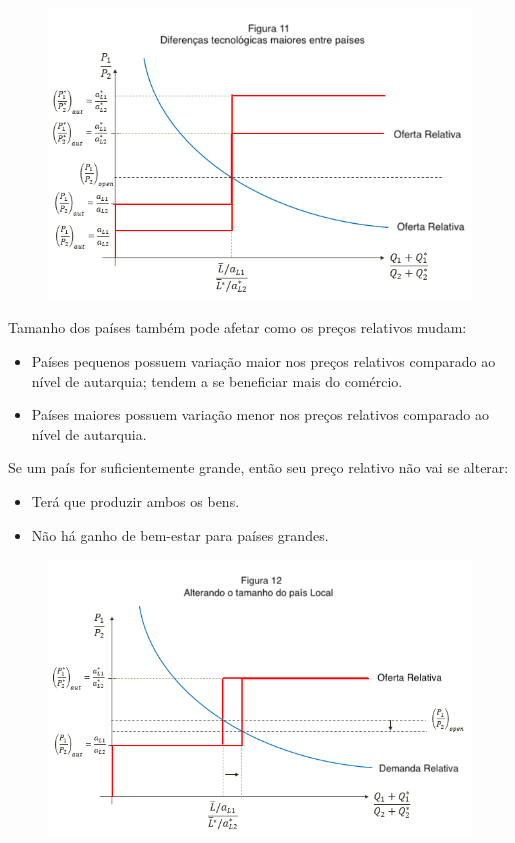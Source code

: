 \documentclass[a4paper,12pt]{article}[abntex2]
\begin{document}
\begin{figure}[H]
    \centering
    \includegraphics[width=0.7\linewidth]{Imagens/a9i13.png}
\end{figure}

Tamanho dos países também pode afetar como os preços relativos mudam:

\begin{itemize}
    \item Países pequenos possuem variação maior nos preços relativos comparado ao nível de autarquia; tendem a se beneficiar mais do comércio.
    \item Países maiores possuem variação menor nos preços relativos comparado ao nível de autarquia.
\end{itemize}

Se um país for suficientemente grande, então seu preço relativo não vai se alterar:

\begin{itemize}
    \item Terá que produzir ambos os bens.
    \item Não há ganho de bem-estar para países grandes.
\end{itemize}

\begin{figure}[H]
    \centering
    \includegraphics[width=0.7\linewidth]{Imagens/a9i14.png}
\end{figure}
\end{document}
